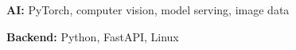 \item \textbf{AI:} PyTorch, computer vision, model serving, image data
\item \textbf{Backend:} Python, FastAPI, Linux
